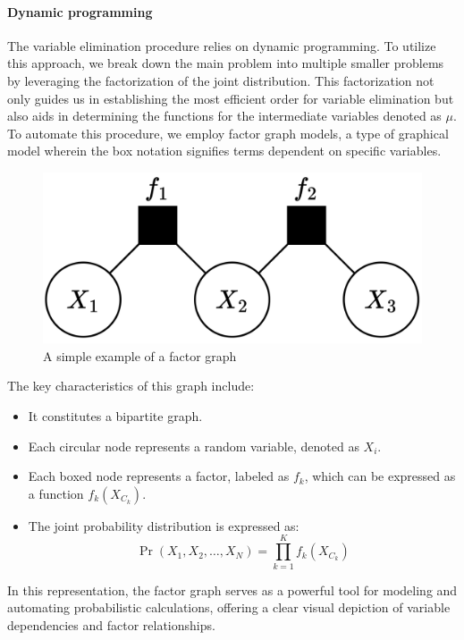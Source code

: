 \paragraph*{Dynamic programming}
The variable elimination procedure relies on dynamic programming. 
To utilize this approach, we break down the main problem into multiple smaller problems by leveraging the factorization of the joint distribution. 
This factorization not only guides us in establishing the most efficient order for variable elimination but also aids in determining the functions for the intermediate variables denoted as $\mu$.
To automate this procedure, we employ factor graph models, a type of graphical model wherein the box notation signifies terms dependent on specific variables. 
\begin{figure}[H]
    \centering
    \includegraphics[width=0.25\linewidth]{images/fg.png}
    \caption{A simple example of a factor graph}
\end{figure}
The key characteristics of this graph include:
\begin{itemize}
    \item It constitutes a bipartite graph.
    \item Each circular node represents a random variable, denoted as $X_i$.
    \item Each boxed node represents a factor, labeled as $f_k$, which can be expressed as a function $f_k(X_{C_k})$. 
    \item The joint probability distribution is expressed as:
        \[\Pr(X_1,X_2,\dots,X_N)=\prod_{k=1}^K{f_k(X_{C_k})}\]
\end{itemize}
In this representation, the factor graph serves as a powerful tool for modeling and automating probabilistic calculations, offering a clear visual depiction of variable dependencies and factor relationships.

